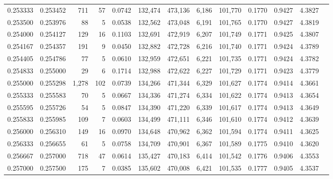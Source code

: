 \begin{tabular}{rrrrrrrrrrrrr}
0.253333 & 0.253452 &   711 &  57 &                                     0.0742 & 132,474 & 473,136 &   6,186 & 101,770 & 0.1770 & 0.9427 & 4.3827 \\
0.253500 & 0.253976 &    88 &   5 &                                     0.0538 & 132,562 & 473,048 &   6,191 & 101,765 & 0.1770 & 0.9427 & 4.3819 \\
0.254000 & 0.254127 &   129 &  16 &                                     0.1103 & 132,691 & 472,919 &   6,207 & 101,749 & 0.1771 & 0.9425 & 4.3807 \\
0.254167 & 0.254357 &   191 &   9 &                                     0.0450 & 132,882 & 472,728 &   6,216 & 101,740 & 0.1771 & 0.9424 & 4.3789 \\
0.254405 & 0.254786 &    77 &   5 &                                     0.0610 & 132,959 & 472,651 &   6,221 & 101,735 & 0.1771 & 0.9424 & 4.3782 \\
0.254833 & 0.255000 &    29 &   6 &                                     0.1714 & 132,988 & 472,622 &   6,227 & 101,729 & 0.1771 & 0.9423 & 4.3779 \\
0.255000 & 0.255298 & 1,278 & 102 &                                     0.0739 & 134,266 & 471,344 &   6,329 & 101,627 & 0.1774 & 0.9414 & 4.3661 \\
0.255333 & 0.255583 &    70 &   5 &                                     0.0667 & 134,336 & 471,274 &   6,334 & 101,622 & 0.1774 & 0.9413 & 4.3654 \\
0.255595 & 0.255726 &    54 &   5 &                                     0.0847 & 134,390 & 471,220 &   6,339 & 101,617 & 0.1774 & 0.9413 & 4.3649 \\
0.255833 & 0.255985 &   109 &   7 &                                     0.0603 & 134,499 & 471,111 &   6,346 & 101,610 & 0.1774 & 0.9412 & 4.3639 \\
0.256000 & 0.256310 &   149 &  16 &                                     0.0970 & 134,648 & 470,962 &   6,362 & 101,594 & 0.1774 & 0.9411 & 4.3625 \\
0.256333 & 0.256655 &    61 &   5 &                                     0.0758 & 134,709 & 470,901 &   6,367 & 101,589 & 0.1775 & 0.9410 & 4.3620 \\
0.256667 & 0.257000 &   718 &  47 &                                     0.0614 & 135,427 & 470,183 &   6,414 & 101,542 & 0.1776 & 0.9406 & 4.3553 \\
0.257000 & 0.257500 &   175 &   7 &                                     0.0385 & 135,602 & 470,008 &   6,421 & 101,535 & 0.1777 & 0.9405 & 4.3537 \\

\end{tabular}
